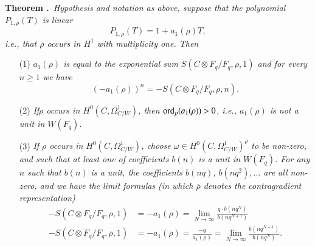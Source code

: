 \noindent
{\bf Theorem .\label{art6-thm6.2}}~{\em Hypothesis and notation as above, suppose that the polynomial $P_{1,\rho}(T)$ is linear}
$$
P_{1,\rho}(T)=1+a_{1}(\rho)T,
$$
{\em i.e., that $\rho$ occurs in $H^{1}$ with multiplicity one. Then}
\begin{itemize}
\item[(1)] {\em $a_{1}(\rho)$ is equal to the exponential sum $S(C\otimes F_{q}/F_{q},\rho,1)$ and for every $n\geq 1$ we have}
$$
(-a_{1}(\rho))^{n}=-S(C\otimes F_{q}/F_{q},\rho,n).
$$

\item[(2)] {\em If\pageoriginale $\rho$ occurs in $H^{0}(C,\Omega^{1}_{C/W})$, then $\operatorname{ord}_{p}(a_{1}(\rho))>0$, i.e., $a_{1}(\rho)$ is not a unit in $W(F_{q})$.}

\item[(3)] {\em If $\rho$ occurs in $H^{0}(C,\Omega^{1}_{C/W})$, choose $\omega\in H^{0}(C,\Omega^{1}_{C/W})^{\rho}$ to be non-zero, and such that at least one of coefficients $b(n)$ is a unit in $W(F_{q})$. For any $n$ such that $b(n)$ is a unit, the coefficients $b(nq)$, $b(nq^{2}),\ldots$ are all non-zero, and we have the limit formulas (in which $\overline{\rho}$ denotes the contragradient representation)}
\begin{align*}
-S(C\otimes F_{q}/F_{q},\rho,1) &= -a_{1}(\rho)=\lim\limits_{N\to \infty} \frac{q\cdot b(nq^{N})}{b(nq^{N+1})}\\[3pt]
-S(C\otimes F_{q}/F_{q},\overline{\rho},1) &= -a_{1}(\overline{\rho})=\frac{-q}{a_{1}(\rho)}=\lim\limits_{N\to \infty}\frac{b(nq^{N+1})}{b(nq^{N})}.
\end{align*}
\end{itemize}

